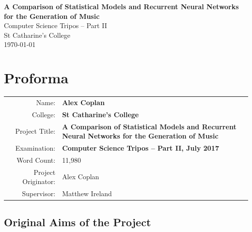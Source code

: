 \documentclass[12pt,a4paper,twoside,openright]{report}
\begin{document}
\cleanlookdateon


\pagestyle{empty}


\vspace*{60mm}
\begin{center}
\Huge
\textbf{A Comparison of Statistical Models and Recurrent Neural Networks for the
Generation of Music} \\[5mm]
Computer Science Tripos -- Part II \\[5mm]
St Catharine's College \\[5mm]
\today  %
\end{center}


\pagestyle{plain}

\chapter*{Proforma}

{\large
\begin{tabular}{r p{10.5cm}}
Name:               & \bf Alex Coplan                       \\
College:            & \bf St Catharine's College                     \\
Project Title:      & \bf A Comparison of Statistical Models and Recurrent
Neural Networks for the \newline Generation of Music \\
Examination:        & \bf Computer Science Tripos -- Part II, July 2017  \\
Word Count:         & 11,980 \\
Project Originator: & Alex Coplan \\
Supervisor:         & Matthew Ireland                    \\ 
\end{tabular}
}


\section*{Original Aims of the Project}
\end{document}

